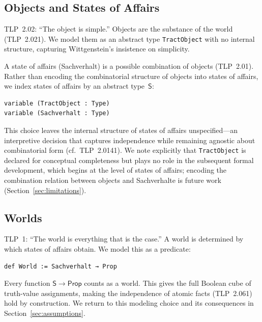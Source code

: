 \documentclass[10pt, letterpaper]{article}
\theoremstyle{definition}
\theoremstyle{remark}
\newcommand{\Sach}{\mathsf{S}}
\newcommand{\Prop}{\mathsf{Prop}}
\begin{document}
\subsection{Objects and States of Affairs}
\label{sec:objects}

TLP~2.02: ``The object is simple.''  Objects are the substance
of the world (TLP~2.021).  We model them as an abstract type
\texttt{TractObject} with no internal structure, capturing
Wittgenstein's insistence on simplicity.

A state of affairs (Sachverhalt) is a possible combination of
objects (TLP~2.01).  Rather than encoding the combinatorial
structure of objects into states of affairs, we index states of
affairs by an abstract type~$\Sach$:

\begin{lstlisting}
variable (TractObject : Type)
variable (Sachverhalt : Type)
\end{lstlisting}

\noindent
This choice leaves the internal structure of states of affairs
unspecified---an interpretive decision that captures independence
while remaining agnostic about combinatorial form (cf.\
TLP~2.0141).  We note explicitly that \texttt{TractObject} is
declared for conceptual completeness but plays no role in the
subsequent formal development, which begins at the level of
states of affairs; encoding the combination relation between
objects and Sachverhalte is future work
(Section~\ref{sec:limitations}).

\subsection{Worlds}
\label{sec:worlds}

TLP~1: ``The world is everything that is the case.''
A world is determined by which states of affairs obtain.  We
model this as a predicate:

\begin{lstlisting}
def World := Sachverhalt → Prop
\end{lstlisting}

\noindent
Every function $\Sach \to \Prop$ counts as a world.  This gives
the full Boolean cube of truth-value assignments, making the
independence of atomic facts (TLP~2.061) hold by construction.
We return to this modeling choice and its consequences in
Section~\ref{sec:assumptions}.
\end{document}
